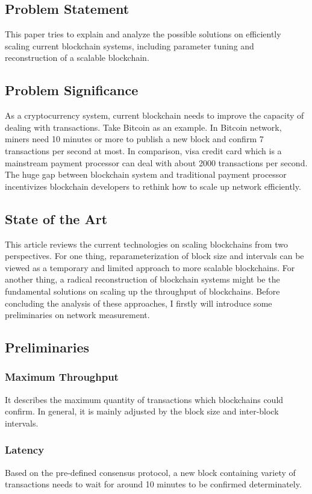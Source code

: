 \documentclass[conference]{IEEEtran}
\begin{document}
\subsection{Problem Statement}
This paper tries to explain and analyze the possible solutions on efficiently scaling current blockchain systems, including parameter tuning and reconstruction of a scalable blockchain.

\subsection{Problem Significance}
As a cryptocurrency system, current blockchain needs to improve the capacity of dealing with transactions.
%
Take Bitcoin as an example.
%
In Bitcoin network, miners need 10 minutes or more to publish a new block and confirm 7 transactions per second at most.
%
In comparison, visa credit card which is a mainstream payment processor can deal with about 2000 transactions per second.
%
The huge gap between blockchain system and traditional payment processor incentivizes blockchain developers to rethink how to scale up network efficiently.

\subsection{State of the Art}
This article reviews the current technologies on scaling blockchains from two perspectives.
%
For one thing, reparameterization of block size and intervals can be viewed as a temporary and limited approach to more scalable blockchains.
%
For another thing, a radical reconstruction of blockchain systems might be the fundamental solutions on scaling up the throughput of blockchains.  
%
Before concluding the analysis of these approaches, I firstly will introduce some preliminaries on network measurement.

\subsection{Preliminaries}

\subsubsection{Maximum Throughput} It describes the maximum quantity of transactions which blockchains could confirm. In general, it is mainly adjusted by the block size and inter-block intervals.

\subsubsection{Latency} Based on the pre-defined consensus protocol, a new block containing variety of transactions needs to wait for around 10 minutes to be confirmed determinately.
\end{document}
